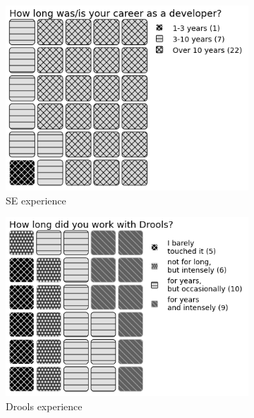 \begin{figure}
    \begin{subfigure}{.33\textwidth}
      \centering
      \includegraphics[width=.95\linewidth]{Sections/images/pie_experiencer4.png}
      \caption{SE experience}
      \label{fig:sfig1}
    \end{subfigure}%
    \begin{subfigure}{.33\textwidth}
      \centering
      \includegraphics[width=.95\linewidth]{Sections/images/pie_droolsExperience4.png}
      \caption{Drools experience}
      \label{fig:sfig2}
    \end{subfigure}
    \begin{subfigure}{.33\textwidth}
        \centering

\end{subfigure}
\end{figure}
